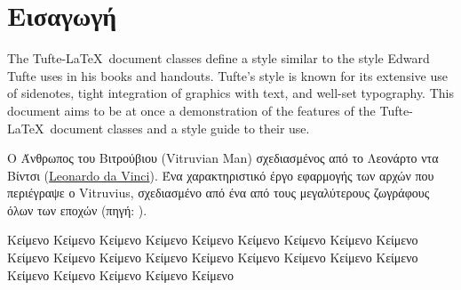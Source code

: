 
\section{Εισαγωγή}\label{sec:intro}

The Tufte-\LaTeX\ document classes define a style similar to the
style Edward Tufte uses in his books and handouts.  Tufte's style is known
for its extensive use of sidenotes, tight integration of graphics with
text, and well-set typography.  This document aims to be at once a
demonstration of the features of the Tufte-\LaTeX\ document classes
and a style guide to their use. \cite{erismis_critical_2013} 

\begin{marginfigure}%
  \caption{\footnotesize Ο  Άνθρωπος του Βιτρούβιου (Vitruvian Man) σχεδιασμένος
  από το Λεονάρτο ντα Βίντσι
  (\href{https://en.wikipedia.org/wiki/Leonardo_da_Vinci}{Leonardo da Vinci}).
  Ένα χαρακτηριστικό έργο εφαρμογής των αρχών που περιέγραψε ο Vitruvius,
  σχεδιασμένο από ένα από τους μεγαλύτερους ζωγράφους όλων των εποχών
  (πηγή: \cite{wikipedia:vitruvianman}).}
  \label{fig:vitruvian-man}
\end{marginfigure}

 Κείμενο Κείμενο Κείμενο Κείμενο Κείμενο Κείμενο Κείμενο Κείμενο Κείμενο Κείμενο Κείμενο Κείμενο Κείμενο Κείμενο Κείμενο Κείμενο Κείμενο Κείμενο Κείμενο Κείμενο Κείμενο Κείμενο Κείμενο 